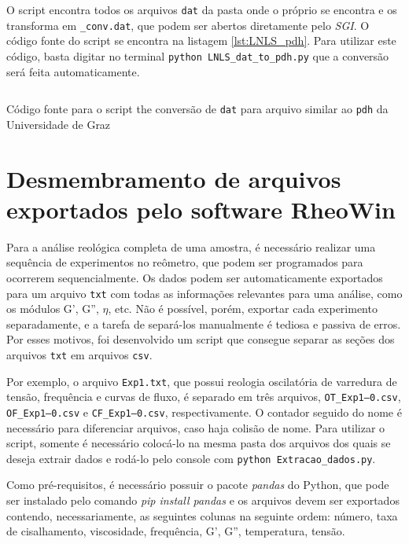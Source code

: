 \begin{apendicesenv}
O script encontra todos os arquivos \texttt{dat} da pasta onde o próprio se encontra e os transforma em \texttt{\_conv.dat}, que podem ser abertos diretamente pelo \emph{SGI}. O código fonte do script se encontra na listagem \ref{lst:LNLS_pdh}. Para utilizar este código, basta digitar no terminal \texttt{python LNLS\_dat\_to\_pdh.py} que a conversão será feita automaticamente.

\begin{listing}[h]
	\inputminted{python}{./python/LNLS_dat_to_pdh.py}
	\caption{Código fonte para o script the conversão de \texttt{dat} para arquivo similar ao \texttt{pdh} da Universidade de Graz}  %
	\label{lst:LNLS_pdh}
\end{listing}

\FloatBarrier

\section{Desmembramento de arquivos exportados pelo software \mbox{RheoWin}}

Para a análise reológica completa de uma amostra, é necessário realizar uma sequência de experimentos no reômetro, que podem ser programados para ocorrerem sequencialmente. Os dados podem ser automaticamente exportados para um arquivo \texttt{txt} com todas as informações relevantes para uma análise, como os módulos G', G'', \(\eta\), etc. Não é possível, porém, exportar cada experimento separadamente, e a tarefa de separá-los manualmente é tediosa e passiva de erros. Por esses motivos, foi desenvolvido um script que consegue separar as seções dos arquivos \texttt{txt} em arquivos \texttt{csv}.

Por exemplo, o arquivo \texttt{Exp1.txt}, que possui reologia oscilatória de varredura de tensão, frequência e curvas de fluxo, é separado em três arquivos, \texttt{OT\_Exp1--0.csv}, \texttt{OF\_Exp1--0.csv} e \texttt{CF\_Exp1--0.csv}, respectivamente. O contador seguido do nome é necessário para diferenciar arquivos, caso haja colisão de nome. Para utilizar o script, somente é necessário colocá-lo na mesma pasta dos arquivos dos quais se deseja extrair dados e rodá-lo pelo console com \texttt{python Extracao\_dados.py}.

Como pré-requisitos, é necessário possuir o pacote \emph{pandas} do Python, que pode ser instalado pelo comando \emph{pip install pandas} e os arquivos devem ser exportados contendo, necessariamente, as seguintes colunas na seguinte ordem: número, taxa de cisalhamento, viscosidade, frequência, G', G'', temperatura, tensão.


\end{apendicesenv}

